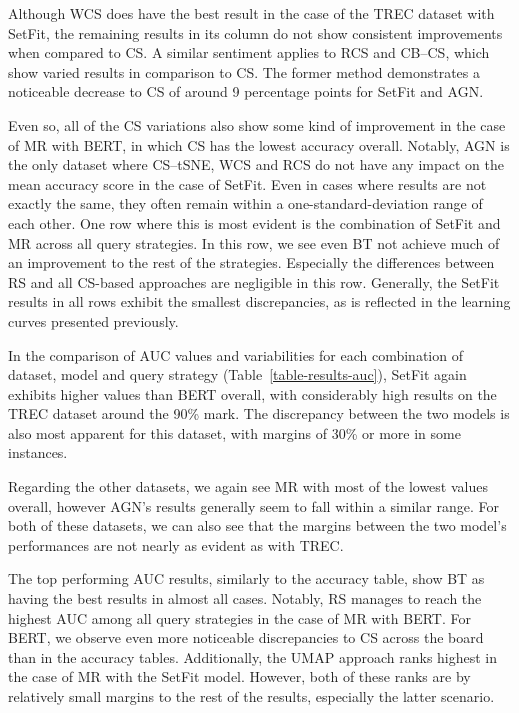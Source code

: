 \documentclass[english,bachelor,ul]{webisthesis} %
\begin{document}
Although WCS does have the best result in the case of the TREC dataset with SetFit, the remaining results in its column do not show consistent improvements when compared to CS. A similar sentiment applies to RCS and CB--CS, which show varied results in comparison to CS. The former method demonstrates a noticeable decrease to CS of around 9 percentage points for SetFit and AGN.

Even so, all of the CS variations also show some kind of improvement in the case of MR with BERT, in which CS has the lowest accuracy overall. Notably, AGN is the only dataset where CS--tSNE, WCS and RCS do not have any impact on the mean accuracy score in the case of SetFit. Even in cases where results are not exactly the same, they often remain within a one-standard-deviation range of each other. One row where this is most evident is the combination of SetFit and MR across all query strategies. In this row, we see even BT not achieve much of an improvement to the rest of the strategies. Especially the differences between RS and all CS-based approaches are negligible in this row. Generally, the SetFit results in all rows exhibit the smallest discrepancies, as is reflected in the learning curves presented previously.

In the comparison of AUC values and variabilities for each combination of dataset, model and query strategy (Table~\ref{table-results-auc}), SetFit again exhibits higher values than BERT overall, with considerably high results on the TREC dataset around the 90\% mark. The discrepancy between the two models is also most apparent for this dataset, with margins of 30\% or more in some instances. 

Regarding the other datasets, we again see MR with most of the lowest values overall, however AGN's results generally seem to fall within a similar range. For both of these datasets, we can also see that the margins between the two model's performances are not nearly as evident as with TREC.

The top performing AUC results, similarly to the accuracy table, show BT as having the best results in almost all cases. Notably, RS manages to reach the highest AUC among all query strategies in the case of MR with BERT. For BERT, we observe even more noticeable discrepancies to CS across the board than in the accuracy tables. Additionally, the UMAP approach ranks highest in the case of MR with the SetFit model. However, both of these ranks are by relatively small margins to the rest of the results, especially the latter scenario. 
\end{document}
